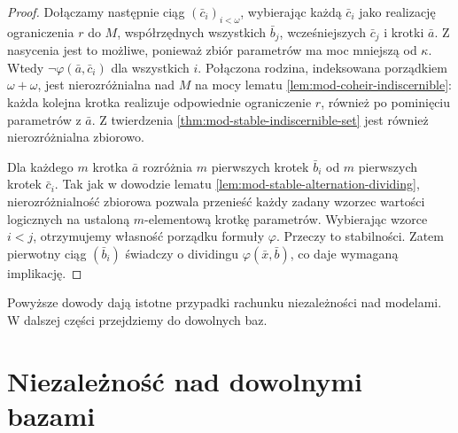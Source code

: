 \begin{proof}
Dołączamy następnie ciąg $(\bar c_i)_{i<\omega}$,
wybierając każdą $\bar c_i$ jako realizację
ograniczenia $r$ do $M$, współrzędnych
wszystkich $\bar b_j$, wcześniejszych
$\bar c_j$ i krotki $\bar a$.
Z nasycenia jest to możliwe, ponieważ
zbiór parametrów ma moc mniejszą od $\kappa$.
Wtedy $\neg\varphi(\bar a,\bar c_i)$
dla wszystkich $i$.
Połączona rodzina, indeksowana porządkiem
$\omega+\omega$, jest nierozróżnialna nad $M$
na mocy lematu \ref{lem:mod-coheir-indiscernible}:
każda kolejna krotka realizuje odpowiednie
ograniczenie $r$, również po pominięciu
parametrów z $\bar a$.
Z twierdzenia \ref{thm:mod-stable-indiscernible-set}
jest również nierozróżnialna zbiorowo.

Dla każdego $m$ krotka $\bar a$ rozróżnia
$m$ pierwszych krotek $\bar b_i$ od $m$
pierwszych krotek $\bar c_i$.
Tak jak w dowodzie lematu
\ref{lem:mod-stable-alternation-dividing},
nierozróżnialność zbiorowa pozwala
przenieść każdy zadany wzorzec wartości
logicznych na ustaloną $m$-elementową
krotkę parametrów.
Wybierając wzorce $i<j$, otrzymujemy
własność porządku formuły $\varphi$.
Przeczy to stabilności.
Zatem pierwotny ciąg $(\bar b_i)$ świadczy
o dividingu $\varphi(\bar x,\bar b)$,
co daje wymaganą implikację.
\end{proof}

Powyższe dowody dają istotne przypadki rachunku
niezależności nad modelami. W dalszej części
przejdziemy do dowolnych baz.

\section{Niezależność nad dowolnymi bazami}

